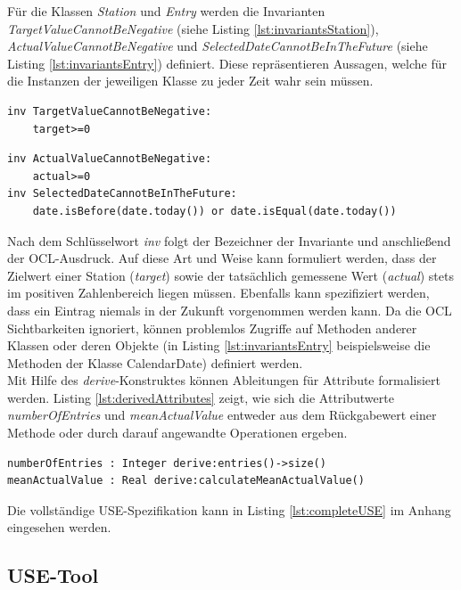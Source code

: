 \documentclass[a4paper,twoside]{article}
\begin{document}
Für die Klassen \textit{Station} und \textit{Entry} werden die Invarianten \textit{TargetValueCannotBeNegative} (siehe Listing \ref{lst:invariantsStation}), \textit{ActualValueCannotBeNegative} und \textit{SelectedDateCannotBeInTheFuture} (siehe Listing \ref{lst:invariantsEntry}) definiert. Diese repräsentieren Aussagen, welche für die Instanzen der jeweiligen Klasse zu jeder Zeit wahr sein müssen. \cite[S.188]{OCLFormal}

\begin{lstlisting}[caption={Invariante in der Klasse Station},label=lst:invariantsStation]
inv TargetValueCannotBeNegative:
	target>=0
\end{lstlisting}
\begin{lstlisting}[caption={Invarianten in der Klasse Entry},label=lst:invariantsEntry]
inv ActualValueCannotBeNegative:
	actual>=0
inv SelectedDateCannotBeInTheFuture:
	date.isBefore(date.today()) or date.isEqual(date.today())
\end{lstlisting}

Nach dem Schlüsselwort \textit{inv} folgt der Bezeichner der Invariante und anschließend der OCL-Ausdruck. Auf diese Art und Weise kann formuliert werden, dass der Zielwert einer Station (\textit{target}) sowie der tatsächlich gemessene Wert (\textit{actual}) stets im positiven Zahlenbereich liegen müssen. Ebenfalls kann spezifiziert werden, dass ein Eintrag niemals in der Zukunft vorgenommen werden kann. Da die OCL Sichtbarkeiten ignoriert, können problemlos Zugriffe auf Methoden anderer Klassen oder deren Objekte (in Listing \ref{lst:invariantsEntry} beispielsweise die Methoden der Klasse CalendarDate) definiert werden. \cite[S.71]{OCLFormal}
\\

Mit Hilfe des \textit{derive}-Konstruktes können Ableitungen für Attribute formalisiert werden. Listing \ref{lst:derivedAttributes} zeigt, wie sich die Attributwerte \textit{numberOfEntries} und \textit{meanActualValue} entweder aus dem Rückgabewert einer Methode oder durch darauf angewandte Operationen ergeben.
\begin{lstlisting}[caption={Abgeleitete Attribute der Klasse Station},label=lst:derivedAttributes]
numberOfEntries : Integer derive:entries()->size()
meanActualValue : Real derive:calculateMeanActualValue()
\end{lstlisting}

Die vollständige USE-Spezifikation kann in Listing \ref{lst:completeUSE} im Anhang eingesehen werden.
\subsection{USE-Tool}
\label{sec:use_tool}
\end{document}
